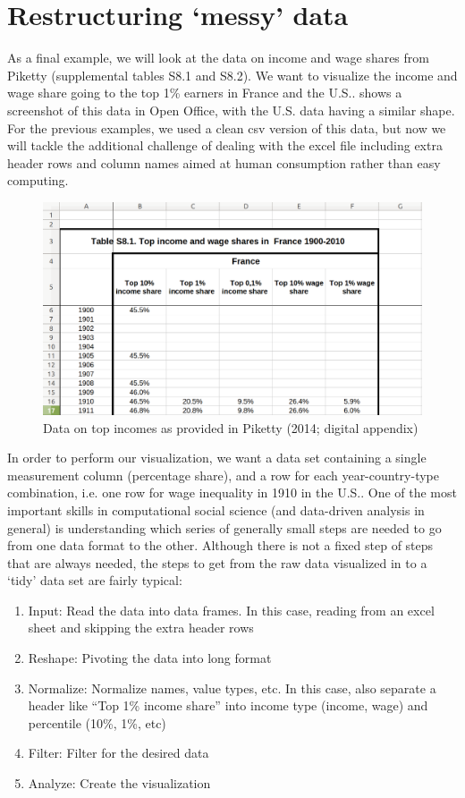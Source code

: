 \section{Restructuring `messy' data}

As a final example, we will look at the data on income and wage shares from Piketty (supplemental tables S8.1 and S8.2).
We want to visualize the income and wage share going to the top 1\% earners in France and the U.S..
 shows a screenshot of this data in Open Office, with the U.S. data having a similar shape.
For the previous examples, we used a clean csv version of this data, but now we will tackle the additional challenge
of dealing with the excel file including extra header rows and column names aimed at human consumption rather than easy computing. 

\begin{figure}
  \includegraphics[width=\linewidth]{ch_data_wrangling/messy.png}
  \caption{Data on top incomes as provided in Piketty (2014; digital appendix)}\label{fig:messy}
\end{figure}

In order to perform our visualization, we want a data set containing a single measurement column (percentage share),
and a row for each year-country-type combination, i.e. one row for wage inequality in 1910 in the U.S..
One of the most important skills in computational social science (and data-driven analysis in general) is
understanding which series of generally small steps are needed to go from one data format to the other.
Although there is not a fixed step of steps that are always needed, the steps to get from the raw data visualized in  to a `tidy' data set are fairly typical:

\begin{enumerate}
  \item Input: Read the data into data frames. In this case, reading from an excel sheet and skipping the extra header rows
  \item Reshape: Pivoting the data into long format
  \item Normalize: Normalize names, value types, etc. In this case, also separate a header like ``Top 1\% income share'' into income type (income, wage) and percentile (10\%, 1\%, etc)
  \item Filter: Filter for the desired data
  \item Analyze: Create the visualization
\end{enumerate}


